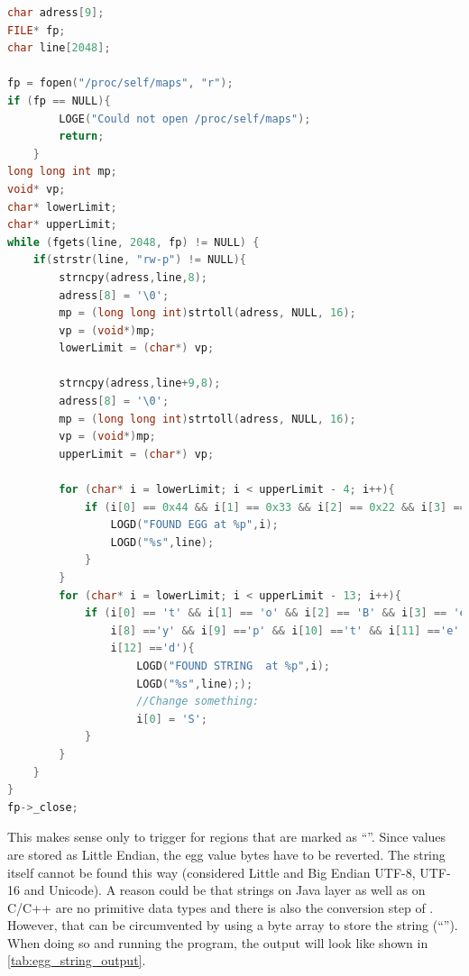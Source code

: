 \begin{lstlisting}[language=C++, caption=Egg Value and String Memory Sweep, label=egg_string_sweep]
char adress[9];
FILE* fp;
char line[2048];

fp = fopen("/proc/self/maps", "r");
if (fp == NULL){
        LOGE("Could not open /proc/self/maps");
        return;
    }
long long int mp;
void* vp;
char* lowerLimit;
char* upperLimit;
while (fgets(line, 2048, fp) != NULL) {
    if(strstr(line, "rw-p") != NULL){
        strncpy(adress,line,8);
        adress[8] = '\0';
        mp = (long long int)strtoll(adress, NULL, 16);
        vp = (void*)mp;
        lowerLimit = (char*) vp;

        strncpy(adress,line+9,8);
        adress[8] = '\0';
        mp = (long long int)strtoll(adress, NULL, 16);
        vp = (void*)mp;
        upperLimit = (char*) vp;

        for (char* i = lowerLimit; i < upperLimit - 4; i++){
            if (i[0] == 0x44 && i[1] == 0x33 && i[2] == 0x22 && i[3] == 0x11){
                LOGD("FOUND EGG at %p",i);
                LOGD("%s",line);
            }
        }
        for (char* i = lowerLimit; i < upperLimit - 13; i++){
            if (i[0] == 't' && i[1] == 'o' && i[2] == 'B' && i[3] == 'e' && i[4] == 'E' && i[5] =='n' && i[6] =='c' && i[7] =='r' &&
                i[8] =='y' && i[9] =='p' && i[10] =='t' && i[11] =='e' &&
                i[12] =='d'){
                    LOGD("FOUND STRING  at %p",i);
                    LOGD("%s",line););
                    //Change something:
                    i[0] = 'S';
            }
        }
    }
}
fp->_close;
\end{lstlisting}
This makes sense only to trigger for regions that are marked as ``''.
Since values are stored as Little Endian, the egg value bytes have to be
reverted. The string itself cannot be found this way
(considered Little and Big Endian UTF-8, UTF-16 and Unicode).
A reason could be that strings on Java layer as well as on C/C++
are no primitive data types and there is also the conversion step of .
However, that can be circumvented by using a byte array to store the string
(``'').
When doing so and running the program, the output will look like
shown in \autoref{tab:egg_string_output}.

